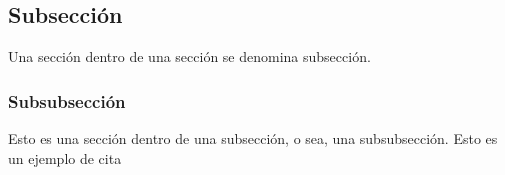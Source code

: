 \documentclass[a4paper, 12pt, oneside]{book}
\begin{document}
	
	
	
	
	
	
	\subsection{Subsecci\'{o}n}
	Una secci\'{o}n dentro de una secci\'{o}n se denomina subsecci\'{o}n.
	\subsubsection{Subsubsecci\'{o}n}
	Esto es una secci\'{o}n dentro de una subsecci\'{o}n, o sea, una subsubsecci\'{o}n.
	Esto es un ejemplo de cita \cite{Zfinitegrading}
	
	
	
	
	
	
\end{document}
